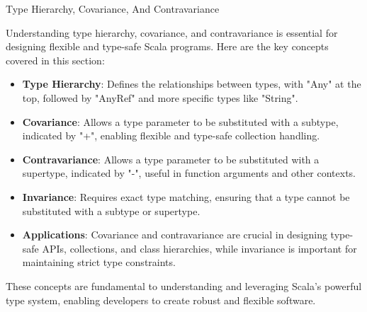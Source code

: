 \begin{notes}{Type Hierarchy, Covariance, And Contravariance}
\begin{highlight}
    \end{highlight}
    
    \begin{highlight}
    
        Understanding type hierarchy, covariance, and contravariance is essential for designing flexible and type-safe Scala programs. Here are the key concepts covered in this section:
    
        \begin{itemize}
            \item \textbf{Type Hierarchy}: Defines the relationships between types, with "Any" at the top, followed by "AnyRef" and more specific types like "String".
            \item \textbf{Covariance}: Allows a type parameter to be substituted with a subtype, indicated by "+", enabling flexible and type-safe collection handling.
            \item \textbf{Contravariance}: Allows a type parameter to be substituted with a supertype, indicated by "-", useful in function arguments and other contexts.
            \item \textbf{Invariance}: Requires exact type matching, ensuring that a type cannot be substituted with a subtype or supertype.
            \item \textbf{Applications}: Covariance and contravariance are crucial in designing type-safe APIs, collections, and class hierarchies, while invariance is important for maintaining strict 
            type constraints.
        \end{itemize}
    
        These concepts are fundamental to understanding and leveraging Scala's powerful type system, enabling developers to create robust and flexible software.
    
    \end{highlight}
\end{notes}